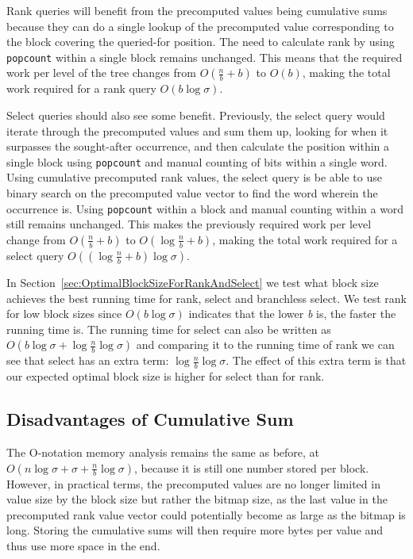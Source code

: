 Rank queries will benefit from the precomputed values being cumulative sums because they can do a single lookup of the precomputed value corresponding to the block covering the queried-for position.
The need to calculate rank by using \texttt{popcount} within a single block remains unchanged.
This means that the required work per level of the tree changes from $O(\frac{n}{b}+b)$ to $O(b)$, making the total work required for a rank query $O(b \log \sigma)$.

Select queries should also see some benefit.
Previously, the select query would iterate through the precomputed values and sum them up, looking for when it surpasses the sought-after occurrence, and then calculate the position within a single block using \texttt{popcount} and manual counting of bits within a single word.
Using cumulative precomputed rank values, the select query is be able to use binary search on the precomputed value vector to find the word wherein the occurrence is.
Using \texttt{popcount} within a block and manual counting within a word still remains unchanged.
This makes the previously required work per level change from $O(\frac{n}{b} + b)$ to $O(\log \frac{n}{b} + b)$, making the total work required for a select query $O((\log \frac{n}{b} + b) \log \sigma)$.

In Section~\ref{sec:OptimalBlockSizeForRankAndSelect} we test what block size achieves the best running time for rank, select and branchless select.
We test rank for low block sizes since $O(b \log \sigma)$ indicates that the lower \textit{b} is, the faster the running time is.
The running time for select can also be written as $O(b \log \sigma + \log \frac{n}{b} \log \sigma)$ and comparing it to the running time of rank we can see that select has an extra term: $\log \frac{n}{b} \log \sigma$.
The effect of this extra term is that our expected optimal block size is higher for select than for rank.

\subsection{Disadvantages of Cumulative Sum}
The O-notation memory analysis remains the same as before, at $O(n \log \sigma + \sigma + \frac{n}{b} \log \sigma)$, because it is still one number stored per block.
However, in practical terms, the precomputed values are no longer limited in value size by the block size but rather the bitmap size, as the last value in the precomputed rank value vector could potentially become as large as the bitmap is long.
Storing the cumulative sums will then require more bytes per value and thus use more space in the end.

